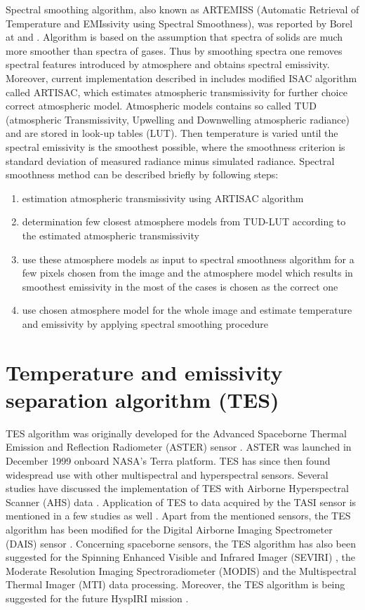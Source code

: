 Spectral smoothing algorithm, also known as ARTEMISS (Automatic Retrieval of Temperature and EMIssivity using Spectral Smoothness), was reported by Borel at \cite{B98} and \cite{B08}. Algorithm is based on the assumption that spectra of solids are much more smoother than spectra of gases. Thus by smoothing spectra one removes spectral features introduced by atmosphere and obtains spectral emissivity. Moreover, current implementation described in \cite{B08} includes modified ISAC algorithm called ARTISAC, which estimates atmospheric transmissivity for further choice correct atmospheric model. Atmospheric models contains so called TUD (atmospheric Transmissivity, Upwelling and Downwelling atmospheric radiance) and are stored in look-up tables (LUT). Then temperature is varied until the spectral emissivity is the smoothest possible, where the smoothness criterion is standard deviation of measured radiance minus simulated radiance. Spectral smoothness method can be described briefly by following steps:
\begin{enumerate}
	\item estimation atmospheric transmissivity using ARTISAC algorithm
	\item determination few closest atmosphere models from TUD-LUT according to the estimated atmospheric transmissivity
	\item use these atmosphere models as input to spectral smoothness algorithm for a few pixels chosen from the image and the atmosphere model which results in smoothest emissivity in the most of the cases is chosen as the correct one
	\item use chosen atmosphere model for the whole image and estimate temperature and emissivity by applying spectral smoothing procedure
\end{enumerate}

\section{Temperature and emissivity separation algorithm (TES)}
\label{sec:TES}

TES algorithm was originally developed for the Advanced Spaceborne Thermal Emission and Reflection Radiometer (ASTER) sensor \cite{GR98}. ASTER was launched in December 1999 onboard NASA's Terra platform. TES has since then found widespread use with other multispectral and hyperspectral sensors. Several studies have discussed the implementation of TES with Airborne Hyperspectral Scanner (AHS) data \cite{SJ06, JS12}. Application of TES to data acquired by the TASI sensor is mentioned in a few studies as well \cite{WX11, PP12}. Apart from the mentioned sensors, the TES algorithm has been modified for the Digital Airborne Imaging Spectrometer (DAIS) sensor \cite{SJ02}. Concerning spaceborne sensors, the TES algorithm has also been suggested for the Spinning Enhanced Visible and Infrared Imager (SEVIRI) \cite{JS14}, the Moderate Resolution Imaging Spectroradiometer (MODIS) \cite{HH11} and the Multispectral Thermal Imager (MTI) \cite{MB02} data processing. Moreover, the TES algorithm is being suggested for the future HyspIRI mission \cite{HH11-2}.

